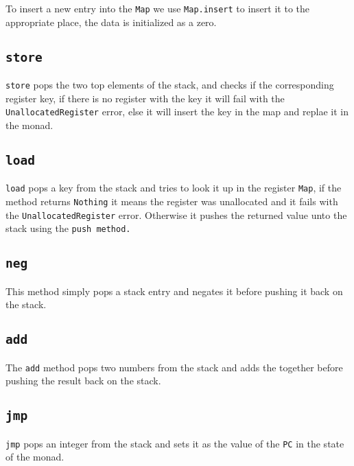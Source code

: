 To insert a new entry into the \texttt{Map} we use \texttt{Map.insert} to insert
it to the appropriate place, the data is initialized as a zero.

\subsection{\texttt{store}}
 \texttt{store}
pops the two top elements of the stack, and checks if the corresponding register
key, if there is no register with the key it will fail with the
\texttt{UnallocatedRegister} error, else it will insert the key in the map and
replae it in the monad.

\subsection{\texttt{load}}

\texttt{load} pops a key from the stack and tries to look it up in the register
\texttt{Map}, if the method returns \texttt{Nothing} it means the register was
unallocated and it fails with the \texttt{UnallocatedRegister} error. Otherwise
it pushes the returned value unto the stack using the \texttt{push method.}

\subsection{\texttt{neg}}

This method simply pops a stack entry and negates it before pushing it back on
the stack.

\subsection{\texttt{add}}

The \texttt{add} method pops two numbers from the stack and adds the together
before pushing the result back on the stack.

\subsection{\texttt{jmp}}

\texttt{jmp} pops an integer from the stack and sets it as the value of the
\texttt{PC} in the state of the monad.

